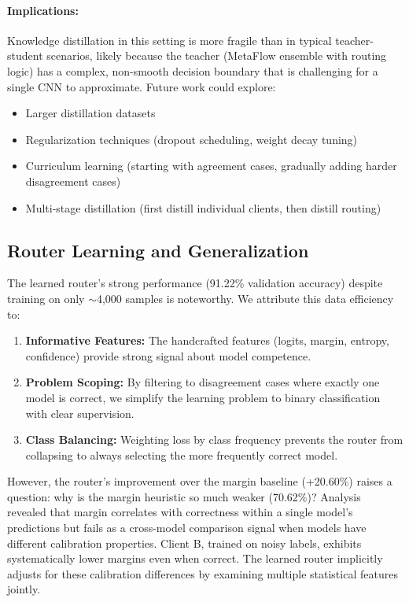 \documentclass[12pt]{article}
\begin{document}
\paragraph{Implications:}
Knowledge distillation in this setting is more fragile than in typical teacher-student scenarios, likely because the teacher (MetaFlow ensemble with routing logic) has a complex, non-smooth decision boundary that is challenging for a single CNN to approximate. Future work could explore:
\begin{itemize}
    \item Larger distillation datasets
    \item Regularization techniques (dropout scheduling, weight decay tuning)
    \item Curriculum learning (starting with agreement cases, gradually adding harder disagreement cases)
    \item Multi-stage distillation (first distill individual clients, then distill routing)
\end{itemize}

\subsection{Router Learning and Generalization}

The learned router's strong performance (91.22\% validation accuracy) despite training on only $\sim$4,000 samples is noteworthy. We attribute this data efficiency to:

\begin{enumerate}
    \item \textbf{Informative Features:} The handcrafted features (logits, margin, entropy, confidence) provide strong signal about model competence.
    
    \item \textbf{Problem Scoping:} By filtering to disagreement cases where exactly one model is correct, we simplify the learning problem to binary classification with clear supervision.
    
    \item \textbf{Class Balancing:} Weighting loss by class frequency prevents the router from collapsing to always selecting the more frequently correct model.
\end{enumerate}

However, the router's improvement over the margin baseline (+20.60\%) raises a question: why is the margin heuristic so much weaker (70.62\%)? Analysis revealed that margin correlates with correctness within a single model's predictions but fails as a cross-model comparison signal when models have different calibration properties. Client B, trained on noisy labels, exhibits systematically lower margins even when correct. The learned router implicitly adjusts for these calibration differences by examining multiple statistical features jointly.
\end{document}
